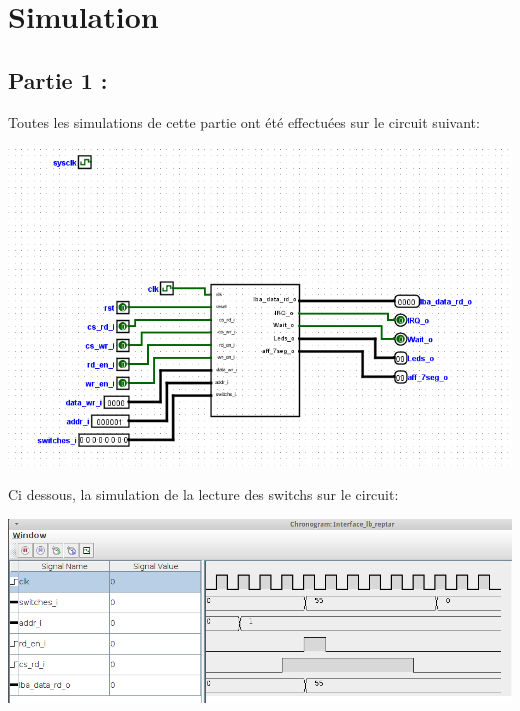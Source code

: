 \section{Simulation}

\subsection*{Partie 1 :}
\par
Toutes les simulations de cette partie ont été effectuées sur le circuit suivant:\\
\begin{center}
\includegraphics[scale=0.8]{./images/circTest_partie1.png}\\\par
{}
\end{center}\par
Ci dessous, la simulation de la lecture des switchs sur le circuit:\\
\begin{center}
\includegraphics[scale=0.6]{./images/Test_Part1_Read_Timing_Bus_Reptar.png}\\\par
{}
\end{center}\par

